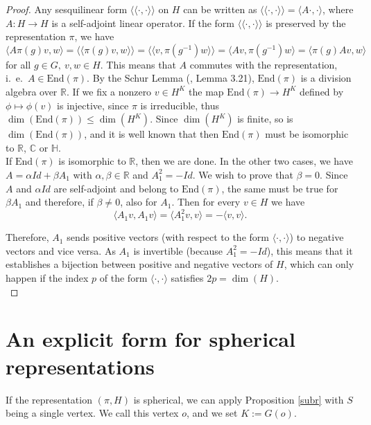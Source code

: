 \documentclass{article}
\theoremstyle{definition}
\theoremstyle{remark}
\theoremstyle{plain}
\begin{document}
\begin{proof}
Any sesquilinear form $\langle\langle\cdot,\cdot\rangle\rangle$ on $H$ can be written as $\langle\langle\cdot,\cdot\rangle\rangle=\langle A\cdot,\cdot\rangle$, where $A: H\rightarrow H$ is a self-adjoint linear operator. If the form $\langle\langle\cdot,\cdot\rangle\rangle$ is preserved by the representation $\pi$, we have $$\langle A\pi(g)v,w\rangle=\langle\langle\pi(g)v,w\rangle\rangle=\langle\langle v,\pi(g^{-1})w\rangle\rangle=\langle Av,\pi(g^{-1})w\rangle=\langle \pi(g)Av,w\rangle$$ for all $g\in G,\ v,w\in H$. This means that $A$ commutes with the representation, i.~e.~$A\in\mathrm{End}(\pi)$. By the Schur Lemma (\cite{bbej}, Lemma 3.21), $\mathrm{End}(\pi)$ is a division algebra over $\mathbb{R}$. If we fix a nonzero $v\in H^K$ the map $\mathrm{End}(\pi)\rightarrow H^K$ defined by $\phi\mapsto\phi(v)$ is injective, since $\pi$ is irreducible, thus $\dim(\mathrm{End}(\pi))\leq\dim(H^K)$. Since $\dim(H^K)$ is finite, so is $\dim(\mathrm{End}(\pi))$, and it is well known that then $\mathrm{End}(\pi)$ must be isomorphic to $\mathbb{R}$, $\mathbb{C}$ or $\mathbb{H}$. \\

If $\mathrm{End}(\pi)$ is isomorphic to $\mathbb{R}$, then we are done. In the other two cases, we have $A=\alpha Id+\beta A_1$ with $\alpha,\beta\in\mathbb{R}$ and $A_1^2=-Id$. We wish to prove that $\beta=0$. Since $A$ and $\alpha Id$ are self-adjoint and belong to $\mathrm{End}(\pi)$, the same must be true for $\beta A_1$ and therefore, if $\beta\neq 0$, also for $A_1$. Then for every $v\in H$ we have $$\langle A_1 v,A_1 v\rangle=\langle A_1^2 v,v\rangle=-\langle v,v\rangle.$$

Therefore, $A_1$ sends positive vectors (with respect to the form $\langle\cdot,\cdot\rangle$) to negative vectors and vice versa. As $A_1$ is invertible (because $A_1^2=-Id$), this means that it establishes a bijection between positive and negative vectors of $H$, which can only happen if the index $p$ of the form $\langle\cdot,\cdot\rangle$ satisfies $2p=\dim(H)$. \\
\end{proof}

\section{An explicit form for spherical representations}

If the representation $(\pi,H)$ is spherical, we can apply Proposition \ref{subr} with $S$ being a single vertex. We call this vertex $o$, and we set $K:=G(o)$. \\
\end{document}
